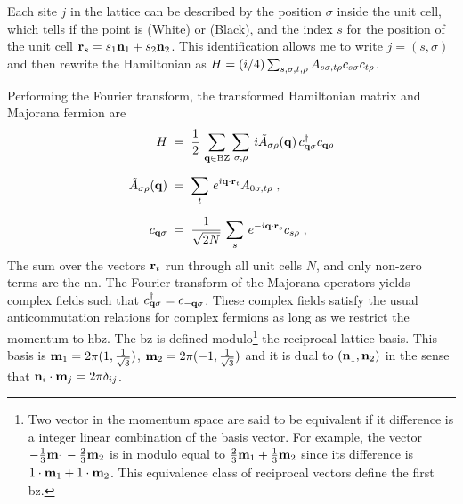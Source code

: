 Each site $j$ in the lattice can be described by the position $\sigma$  inside the unit cell, which tells if the point is (White) or (Black), and the index $s$ for the position of the unit cell $\bf{r}_s = s_1 \bf{n}_1 + s_2 \bf{n}_2$. This identification allows me to write  $j = (s,\sigma)$ and then rewrite the Hamiltonian as $H = (\im/4) \sum_{s,\sigma , t , \rho} A_{s\sigma , t \rho} c_{s\sigma} c_{t \rho}$.

Performing the Fourier transform, the transformed Hamiltonian matrix and Majorana fermion are 
\begin{align}
    H \; &= \; \frac{1}{2} \, \sum_{ \bf{q} \in \text{BZ} } \sum_{\sigma , \rho } \, \im 
    \tilde{A}_{\sigma \rho}( \bf{q} ) \,  c_{\bf{q} \sigma}^{\dagger}  c_{\bf{q} \rho}  \label{eq:2-h-fourier-ia}\\[6pt] 
     \tilde{A}_{\sigma \rho}( \bf{q} )  \; &= \;  \sum_{t} \, e^{\im \bf{q}\cdot \bf{r}_t} A_{0\sigma,t\rho} \; \label{eq:2-fourier-h} , \\[6pt]
    c_{\bf{q} \sigma} \; &= \; \frac{1}{\sqrt{2N}} \, \sum_{s} \, e^{- \im \bf{q} \cdot \bf{r}_s } c_{s\rho} \; ,
\end{align}The sum over the vectors $\bf{r}_t$ run through all unit cells $N$, and only non-zero terms are the \acrshort{nn}. The Fourier transform of the Majorana operators yields complex fields such that $c_{\bf{q} \sigma}^{\dagger} = c_{-\bf{q} \sigma}$. These complex fields satisfy the usual anticommutation relations for complex fermions as long as we restrict the momentum to \acrfull{hbz}. The \acrfull{bz} is defined modulo\footnote{%
Two vector in the momentum space are said to be equivalent if it difference is a integer linear combination of the basis vector. For example, the vector $-\frac{1}{3}\bf{m}_1-\frac{2}{3}\bf{m}_2$ is in modulo equal to $\frac{2}{3}\bf{m}_1+\frac{1}{3}\bf{m}_2$ since its difference is $1 \cdot \bf{m}_1 + 1 \cdot \bf{m}_2$.  This equivalence class of reciprocal vectors define the first \acrlong{bz}. } the reciprocal lattice basis. This basis is $\bf{m}_1 = 2\pi (1,\frac{1}{\sqrt{3}})$, $\bf{m}_2 = 2\pi (-1,\frac{1}{\sqrt{3}})$ and it is dual to $(\bf{n}_1 , \bf{n}_2)$ in the sense that $\bf{n}_i \cdot \bf{m}_j = 2 \pi \delta_{ij}$.

